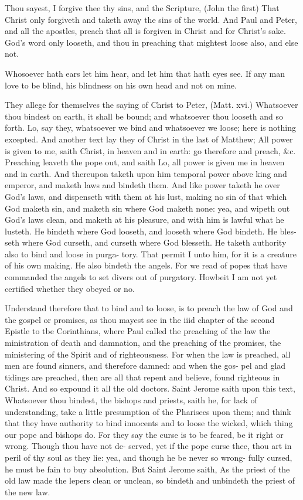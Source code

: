 \documentclass{custom}
\begin{document}
Thou sayest, I forgive thee thy sins, and the Scripture, 
(John the first) That Christ only forgiveth and taketh away 
the sins of the world. And Paul and Peter, and all the 
apostles, preach that all is forgiven in Christ and for Christ's 
sake. God's word only looseth, and thou in preaching 
that mightest loose also, and else not. 

Whosoever hath ears let him hear, and let him that hath 
eyes see. If any man love to be blind, his blindness on 
his own head and not on mine. 


They allege for themselves the saying of Christ to 
Peter, (Matt. xvi.) Whatsoever thou bindest on earth, it 
shall be bound; and whatsoever thou looseth and so forth. 
Lo, say they, whatsoever we bind and whatsoever we loose; 
here is nothing excepted. And another text lay they of 
Christ in the last of Matthew; All power is given to me, 
saith Christ, in heaven and in earth: go therefore and 
preach, &c. Preaching leaveth the pope out, and saith 
Lo, all power is given me in heaven and in earth. And 
thereupon taketh upon him temporal power above king and 
emperor, and maketh laws and bindeth them. And like 
power taketh he over God's laws, and dispenseth with them 
at his lust, making no sin of that which God maketh sin, 
and maketh sin where God maketh none: yea, and wipeth 
out God's laws clean, and maketh at his pleasure, and 
with him is lawful what he lusteth. He bindeth where 
God looseth, and looseth where God bindeth. He bles- 
seth where God curseth, and curseth where God blesseth. 
He taketh authority also to bind and loose in purga- 
tory. That permit I unto him, for it is a creature of his 
own making. He also bindeth the angels. For we read 
of popes that have commanded the angels to set divers 
out of purgatory. Howbeit I am not yet certified whether 
they obeyed or no. 

Understand therefore that to bind and to loose, is to 
preach the law of God and the gospel or promises, as thou 
mayest see in the iiid chapter of the second Epistle to tbe 
Corinthians, where Paul called the preaching of the law the 
ministration of death and damnation, and the preaching 
of the promises, the ministering of the Spirit and of 
righteousness. For when the law is preached, all men are 
found sinners, and therefore damned: and when the gos- 
pel and glad tidings are preached, then are all that repent 
and believe, found righteous in Christ. And so expound 
it all the old doctors. Saint Jerome saith upon this text, 
Whatsoever thou bindest, the bishops and priests, saith he, 
for lack of understanding, take a little presumption of the 
Pharisees upon them; and think that they have authority to 
bind innocents and to loose the wicked, which thing our 
pope and bishops do. For they say the curse is to be
feared, be it right or wrong. Though thou have not de-
served, yet if the pope curse thee, thou art in peril of thy 
soul as they lie: yea, and though he be never so wrong- 
fully cursed, he must be fain to buy absolution. But
Saint Jerome saith, As the priest of the old law made the
lepers clean or unclean, so bindeth and unbindeth the 
priest of the new law. 
\end{document}
